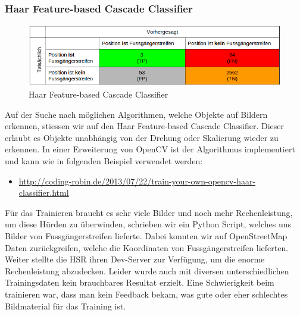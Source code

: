 \subsubsection{\Gls{Haar Feature-based Cascade Classifier}}
\begin{figure}[H]
\includegraphics[width=\textwidth]{images/haar_conf.png}
\caption[Haar Feature-based Cascade Classifier]{Haar Feature-based Cascade Classifier}
\end{figure}
Auf der Suche nach möglichen Algorithmen, welche Objekte auf Bildern erkennen, stiessen wir auf den Haar Feature-based Cascade Classifier. Dieser erlaubt es Objekte unabhängig von der Drehung oder Skalierung wieder zu erkennen. In einer Erweiterung von OpenCV ist der Algorithmus implementiert und kann wie in folgenden Beispiel verwendet werden: 
\begin{itemize}
	\item \url{http://coding-robin.de/2013/07/22/train-your-own-opencv-haar-classifier.html}
\end{itemize}
Für das Trainieren braucht es sehr viele Bilder und noch mehr Rechenleistung, um diese Hürden zu überwinden, schrieben wir ein Python Script, welches uns Bilder von Fussgängerstreifen lieferte. Dabei konnten wir auf OpenStreetMap Daten zurückgreifen, welche die Koordinaten von Fussgängerstreifen lieferten. Weiter stellte die HSR ihren Dev-Server zur Verfügung, um die enorme Rechenleistung abzudecken. Leider wurde auch mit diversen unterschiedlichen Trainingsdaten kein brauchbares Resultat erzielt. Eine Schwierigkeit beim trainieren war, dass man kein Feedback bekam, was gute oder eher schlechtes Bildmaterial für das Training ist.

